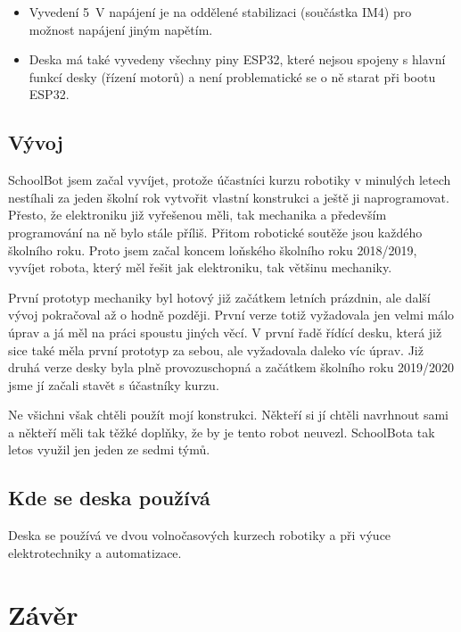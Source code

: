 \documentclass{template/socthesis}
\begin{document}
\begin{itemize}
	\item Vyvedení 5~V napájení je na oddělené stabilizaci (součástka IM4) pro možnost napájení jiným napětím.
	
	\item Deska má také vyvedeny všechny piny ESP32, které nejsou spojeny 
	s hlavní funkcí desky (řízení motorů) a není problematické se o ně starat při bootu ESP32.
	
	\end{itemize}
\section{Vývoj}

SchoolBot jsem začal vyvíjet, protože účastníci kurzu robotiky v minulých letech nestíhali za jeden školní rok vytvořit vlastní konstrukci a ještě ji naprogramovat. Přesto, že elektroniku již vyřešenou měli, tak mechanika a především programování na ně bylo stále příliš. Přitom robotické soutěže jsou  každého školního roku. Proto jsem začal koncem loňského školního roku 2018/2019, vyvíjet robota, který měl řešit jak elektroniku, tak většinu mechaniky. 

První prototyp mechaniky byl hotový již začátkem letních prázdnin, ale další vývoj pokračoval až o hodně později. První verze totiž vyžadovala jen velmi málo úprav a já měl na práci spoustu jiných věcí. V první řadě řídící desku, která již sice také měla první prototyp za sebou, ale vyžadovala daleko víc úprav. Již druhá verze desky byla plně provozuschopná a začátkem školního roku 2019/2020 jsme jí začali stavět s účastníky kurzu.

 Ne všichni však chtěli použít mojí konstrukci. Někteří si jí chtěli navrhnout sami a někteří měli tak těžké doplňky, že by je tento robot neuvezl. 
SchoolBota tak letos využil jen jeden ze sedmi týmů.

\section{Kde se deska používá}
Deska se používá ve dvou volnočasových kurzech robotiky a při výuce elektrotechniky a automatizace.


\chapter*{Závěr}

\newpage
\end{document}
